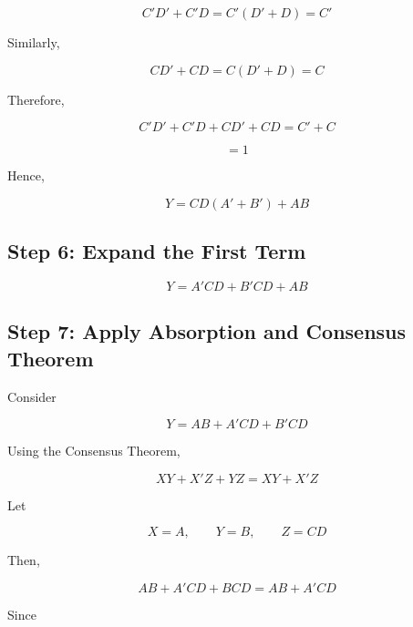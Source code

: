 \documentclass[12pt,a4paper]{article}
\begin{document}
\begin{equation}
C'D'+C'D=C'(D'+D)=C'
\end{equation}

Similarly,

\begin{equation}
CD'+CD=C(D'+D)=C
\end{equation}

Therefore,

\begin{equation}
C'D'+C'D+CD'+CD=C'+C
\end{equation}

\begin{equation}
=1
\end{equation}

Hence,

\begin{equation}
Y=CD(A'+B')+AB
\end{equation}

\subsection*{Step 6: Expand the First Term}

\begin{equation}
Y=A'CD+B'CD+AB
\end{equation}

\subsection*{Step 7: Apply Absorption and Consensus Theorem}

Consider

\begin{equation}
Y=AB+A'CD+B'CD
\end{equation}

Using the Consensus Theorem,

\begin{equation}
XY+X'Z+YZ=XY+X'Z
\end{equation}

Let

\begin{equation}
X=A,\qquad Y=B,\qquad Z=CD
\end{equation}

Then,

\begin{equation}
AB+A'CD+BCD=AB+A'CD
\end{equation}

Since
\end{document}
